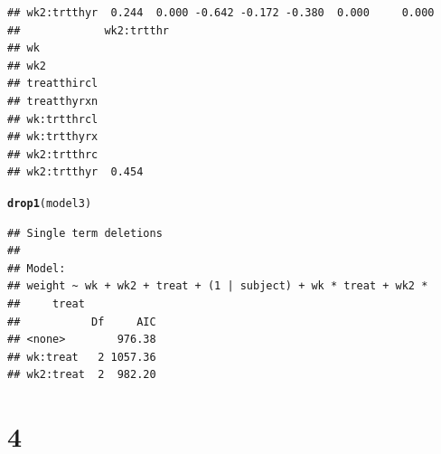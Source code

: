 \documentclass{article}\usepackage[]{graphicx}\usepackage[]{color}
\makeatletter
\newcommand{\hlstd}[1]{\textcolor[rgb]{0.345,0.345,0.345}{#1}}%
\newcommand{\hlkwd}[1]{\textcolor[rgb]{0.737,0.353,0.396}{\textbf{#1}}}%
\newenvironment{kframe}{%
 \def\at@end@of@kframe{}%
 \ifinner\ifhmode%
  \def\at@end@of@kframe{\end{minipage}}%
  \begin{minipage}{\columnwidth}%
 \fi\fi%
 \def\FrameCommand##1{\hskip\@totalleftmargin \hskip-\fboxsep
 \colorbox{shadecolor}{##1}\hskip-\fboxsep
     \hskip-\linewidth \hskip-\@totalleftmargin \hskip\columnwidth}%
 \MakeFramed {\advance\hsize-\width
   \@totalleftmargin\z@ \linewidth\hsize
   \@setminipage}}%
 {\par\unskip\endMakeFramed%
 \at@end@of@kframe}
\newenvironment{knitrout}{}{} %
\makeatother
\begin{document}
\begin{enumerate}[(a)]
\begin{knitrout}
\begin{kframe}
\begin{verbatim}
## wk2:trtthyr  0.244  0.000 -0.642 -0.172 -0.380  0.000     0.000   
##             wk2:trtthr
## wk                    
## wk2                   
## treatthircl           
## treatthyrxn           
## wk:trtthrcl           
## wk:trtthyrx           
## wk2:trtthrc           
## wk2:trtthyr  0.454
\end{verbatim}
\begin{alltt}
  \hlkwd{drop1}\hlstd{(model3)}
\end{alltt}
\begin{verbatim}
## Single term deletions
## 
## Model:
## weight ~ wk + wk2 + treat + (1 | subject) + wk * treat + wk2 * 
##     treat
##           Df     AIC
## <none>        976.38
## wk:treat   2 1057.36
## wk2:treat  2  982.20
\end{verbatim}
\end{kframe}
\end{knitrout}

\end{enumerate}

\section{4}
\end{document}
